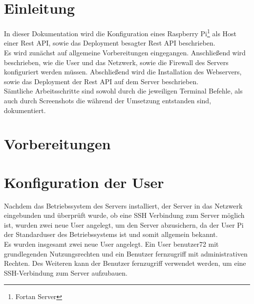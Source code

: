 \documentclass[a4paper, 11pt]{scrartcl}
\begin{document}
\section{Einleitung}
In dieser Dokumentation wird die Konfiguration eines Raspberry Pi\footnote{Fortan \glqq Server\grqq} als Host einer Rest API, sowie das Deployment besagter Rest API beschrieben.
\\
Es wird zunächst auf allgemeine Vorbereitungen eingegangen. Anschließend wird beschrieben, wie die User und das Netzwerk, sowie die Firewall des Servers konfiguriert werden müssen.
Abschließend wird die Installation des Webservers, sowie das Deployment der Rest API auf dem Server beschrieben.
\\
Sämtliche Arbeitsschritte sind sowohl durch die jeweiligen Terminal Befehle, als auch durch Screenshots die während der Umsetzung entstanden sind, dokumentiert.



\section{Vorbereitungen}

\section{Konfiguration der User}\label{ch:user}
Nachdem das Betriebssystem des Servers installiert, der Server in das Netzwerk eingebunden und überprüft wurde, ob eine SSH Verbindung zum Server möglich ist, wurden zwei neue User angelegt, um den Server
abzusichern, da der User \glqq Pi\grqq{} der Standarduser des Betriebssystems ist und somit allgemein bekannt.
\\
Es wurden insgesamt zwei neue User angelegt. Ein User \glqq benutzer72\grqq{} mit grundlegenden Nutzungsrechten und ein Benutzer \glqq fernzugriff\grqq{} mit administrativen Rechten. Des Weiteren kann der
Benutzer \glqq fernzugriff\grqq{} verwendet werden, um eine SSH-Verbindung zum Server aufzubauen.
\end{document}
